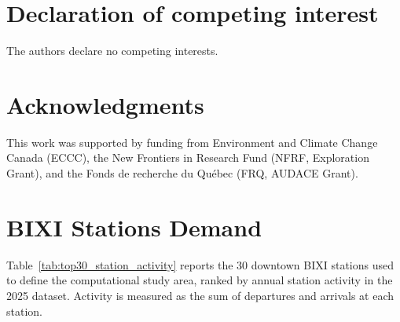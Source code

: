 \documentclass[preprint,authoryear,10pt]{elsarticle}
\begin{document}
\section*{Declaration of competing interest}
The authors declare no competing interests.

\section*{Acknowledgments}
This work was supported by funding from Environment and Climate Change Canada (ECCC), the New Frontiers in Research Fund (NFRF, Exploration Grant), and the Fonds de recherche du Québec (FRQ, AUDACE Grant).


\appendix
\setcounter{figure}{0}
\setcounter{table}{0}
\section{BIXI Stations Demand}\label{app:top30_stations}

Table~\ref{tab:top30_station_activity} reports the 30 downtown BIXI stations used to define the computational study area, ranked by annual station activity in the 2025 dataset. Activity is measured as the sum of departures and arrivals at each station.
\end{document}
